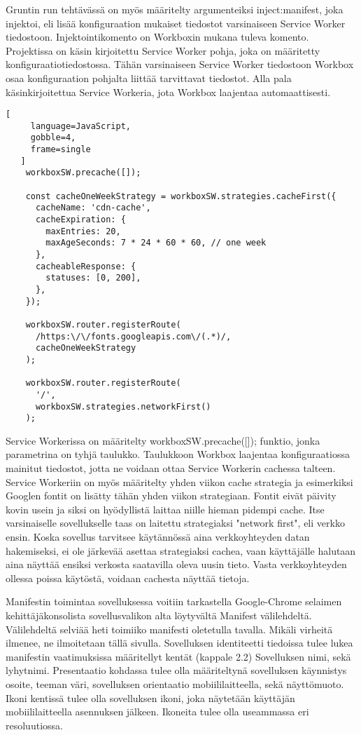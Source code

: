 \documentclass{tktltiki}
\begin{document}
Gruntin run tehtävässä on myös määritelty argumenteiksi inject:manifest, joka injektoi, eli lisää konfiguraation mukaiset tiedostot varsinaiseen Service Worker tiedostoon. Injektointikomento on Workboxin mukana tuleva komento. Projektissa on käsin kirjoitettu Service Worker pohja, joka on määritetty konfiguraatiotiedostossa. Tähän varsinaiseen Service Worker tiedostoon Workbox osaa konfiguraation pohjalta liittää tarvittavat tiedostot. Alla pala käsinkirjoitettua Service Workeria, jota Workbox laajentaa automaattisesti.

\begin{lstlisting}[
     language=JavaScript,
     gobble=4,
     frame=single
   ]
    workboxSW.precache([]);
    
    const cacheOneWeekStrategy = workboxSW.strategies.cacheFirst({
      cacheName: 'cdn-cache',
      cacheExpiration: {
        maxEntries: 20,
        maxAgeSeconds: 7 * 24 * 60 * 60, // one week
      },
      cacheableResponse: {
        statuses: [0, 200],
      },
    });
    
    workboxSW.router.registerRoute(
      /https:\/\/fonts.googleapis.com\/(.*)/,
      cacheOneWeekStrategy
    );
    
    workboxSW.router.registerRoute(
      '/',
      workboxSW.strategies.networkFirst()
    );
\end{lstlisting}

Service Workerissa on määritelty workboxSW.precache([]); funktio, jonka parametrina on tyhjä taulukko. Taulukkoon Workbox laajentaa konfiguraatiossa mainitut tiedostot, jotta ne voidaan ottaa Service Workerin cachessa talteen. Service Workeriin on myös määritelty yhden viikon cache strategia ja esimerkiksi Googlen fontit on lisätty tähän yhden viikon strategiaan. Fontit eivät päivity kovin usein ja siksi on hyödyllistä laittaa niille hieman pidempi cache. Itse varsinaiselle sovellukselle taas on laitettu strategiaksi "network first", eli verkko ensin. Koska sovellus tarvitsee käytännössä aina verkkoyhteyden datan hakemiseksi, ei ole järkevää asettaa strategiaksi cachea, vaan käyttäjälle halutaan aina näyttää ensiksi verkosta saatavilla oleva uusin tieto. Vasta verkkoyhteyden ollessa poissa käytöstä, voidaan cachesta näyttää tietoja. 

Manifestin toimintaa sovelluksessa voitiin tarkastella Google-Chrome selaimen kehittäjäkonsolista sovellusvalikon alta löytyvältä Manifest välilehdeltä. Välilehdeltä selviää heti toimiiko manifesti oletetulla tavalla. Mikäli virheitä ilmenee, ne ilmoitetaan tällä sivulla. Sovelluksen identiteetti tiedoissa tulee lukea manifestin vaatimuksissa määritellyt kentät (kappale 2.2) Sovelluksen nimi, sekä lyhytnimi. Presentaatio kohdassa tulee olla määriteltynä sovelluksen käynnistys osoite, teeman väri, sovelluksen orientaatio mobiililaitteella, sekä näyttömuoto. Ikoni kentissä tulee olla sovelluksen ikoni, joka näytetään käyttäjän mobiililaitteella asennuksen jälkeen. Ikoneita tulee olla useammassa eri resoluutiossa. 
\end{document}
